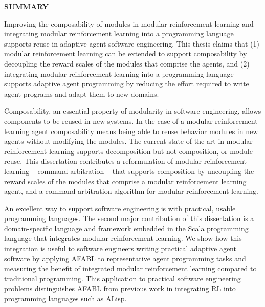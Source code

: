 \clearpage
\begin{centering}
\textbf{SUMMARY}\\
\vspace{\baselineskip}
\end{centering}

Improving the composability of modules in modular reinforcement learning and integrating modular reinforcement learning into a programming language supports reuse in adaptive agent software engineering.  This thesis claims that (1) modular reinforcement learning can be extended to support composability by decoupling the reward scales of the modules that comprise the agents, and (2) integrating modular reinforcement learning into a programming language supports adaptive agent programming by reducing the effort required to write agent programs and adapt them to new domains.

Composability, an essential property of modularity in software engineering, allows components to be reused in new systems.  In the case of a modular reinforcement learning agent composability means being able to reuse behavior modules in new agents without modifying the modules.  The current state of the art in modular reinforcement learning supports decomposition but not composition, or module reuse.  This dissertation contributes a reformulation of modular reinforcement learning -- command arbitration -- that supports composition by uncoupling the reward scales of the modules that comprise a modular reinforcement learning agent, and a command arbitration algorithm for modular reinforcement learning.

An excellent way to support software engineering is with practical, usable programming languages.  The second major contribution of this dissertation is a domain-specific language and framework embedded in the Scala programming language that integrates modular reinforcement learning.  We show how this integration is useful to software engineers writing practical adaptive agent software by applying AFABL to representative agent programming tasks and measuring the benefit of integrated modular reinforcement learning compared to traditional programming.  This application to practical software engineering problems distinguishes AFABL from previous work in integrating RL into programming languages such as ALisp.

